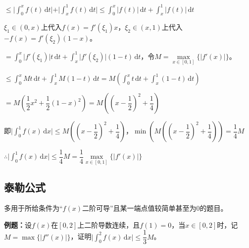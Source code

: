 \documentclass[UTF8, 12pt]{ctexart}
\begin{document}
$\leqslant\vert\int_0^xf(t)\,\textrm{d}t\vert+\vert\int_x^1f(t)\,\textrm{d}t\vert\leqslant\int_0^x\vert f(t)\vert\,\textrm{d}t+\int_x^1\vert f(t)\vert\,\textrm{d}t$

$\xi_1\in(0,x)$上代入$f(x)=f'(\xi_1)x$，$\xi_2\in(x,1)$上代入$-f(x)=f'(\xi_2)(1-x)$。

$=\int_0^x\vert f'(\xi_1)\vert t\,\textrm{d}t+\int_x^1\vert f'(\xi_2)\vert(1-t)\,\textrm{d}t$，令$M=\max\limits_{x\in[0,1]}\{\vert f'(x)\vert\}$。

$\leqslant\int_0^xMt\,\textrm{d}t+\int_x^1M(1-t)\,\textrm{d}t=M\left(\int_0^xt\,\textrm{d}t+\int_x^1(1-t)\,\textrm{d}t\right)$

$=M\left(\dfrac{1}{2}x^2+\dfrac{1}{2}(1-x)^2\right)=M\left(\left(x-\dfrac{1}{2}\right)^2+\dfrac{1}{4}\right)$

即$\vert\int_0^1f(x)\,\textrm{d}x\vert\leqslant M\left(\left(x-\dfrac{1}{2}\right)^2+\dfrac{1}{4}\right)$，$\min\left(M\left(\left(x-\dfrac{1}{2}\right)^2+\dfrac{1}{4}\right)\right)=\dfrac{1}{4}M$

$\therefore\vert\int_0^1f(x)\,\textrm{d}x\vert\leqslant\dfrac{1}{4}M=\dfrac{1}{4}\max\limits_{x\in[0,1]}\{\vert f'(x)\vert\}$

\subsection{泰勒公式}

多用于所给条件为“$f(x)$二阶可导”且某一端点值较简单甚至为0的题目。

\textbf{例题：}设$f(x)$在$[0,2]$上二阶导数连续，且$f(1)=0$，当$x\in[0,2]$时，记$M=\max\{\vert f''(x)\vert\}$，证明$\vert\int_0^2f(x)\,\textrm{d}x\vert\leqslant\dfrac{1}{3}M$。
\end{document}

